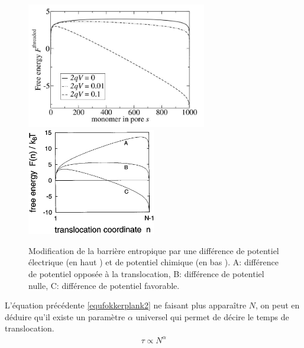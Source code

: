 \begin{figure}[H]
\begin{center}
\includegraphics[width=0.7\textwidth]{transelec.jpg} \includegraphics[width=0.5\textwidth]{transpotchim.jpg}

\caption[Translocation, barrière d'énergie d'origine entropique]{Modification de la barrière entropique par une différence de potentiel électrique (en haut \cite{these}) et de potentiel chimique (en bas \cite{Sung1996}). A: différence de potentiel opposée à la translocation, B: différence de potentiel nulle, C: différence de potentiel favorable.}
\label{energiebarrier}
\end{center}
\end{figure}

L'équation précédente \ref{equfokkerplank2} ne faisant plus apparaître $N$, on peut en déduire qu'il existe un paramètre $\alpha$ universel qui permet de décire le temps de translocation.
\begin{eqnarray}
\tau \propto N^\alpha
\label{tauunbiased}
\end{eqnarray}


